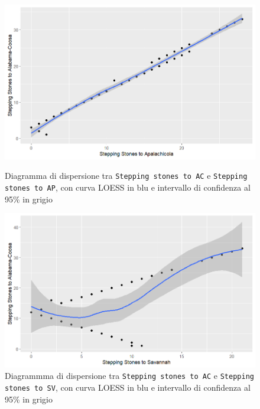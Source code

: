 \documentclass{article} %
\begin{document}
\begin{figure}[H]
    \centering
    \begin{minipage}{0.49\textwidth}
        \centering
        \includegraphics[width=\textwidth]{immagini/ac_ap.png}
        \captionsetup{justification=centering}
        \caption{Diagramma di dispersione tra \texttt{Stepping stones to AC} e \texttt{Stepping stones to AP}, con curva LOESS in blu e intervallo di confidenza al 95\% in grigio}
    \end{minipage}
    \hfill
    \begin{minipage}{0.49\textwidth}
        \centering
        \includegraphics[width=\textwidth]{immagini/ac_sv.png}
        \captionsetup{justification=centering}
        \caption{Diagrammma di dispersione tra \texttt{Stepping stones to AC} e \texttt{Stepping stones to SV}, con curva LOESS in blu e intervallo di confidenza al 95\% in grigio}
    \end{minipage}
    
\end{figure}
\end{document}
